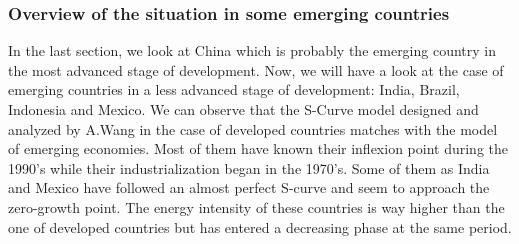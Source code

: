 \documentclass[conference]{IEEEtran}
\begin{document}
\subsubsection{Overview of the situation in some emerging countries}

In the last section, we look at China which is probably the emerging country in the most advanced stage of development. Now, we will have a look at the case of emerging countries in a less advanced stage of development: India, Brazil, Indonesia and Mexico. 
We can observe that the S-Curve model designed and analyzed by A.Wang in the case of developed countries matches with the model of emerging economies. Most of them have known their inflexion point during the 1990’s while their industrialization began in the 1970’s. 
Some of them as India and Mexico have followed an almost perfect S-curve and seem to approach the zero-growth point. The energy intensity of these countries is way higher than the one of developed countries but has entered a decreasing phase at the same period. 
\end{document}
